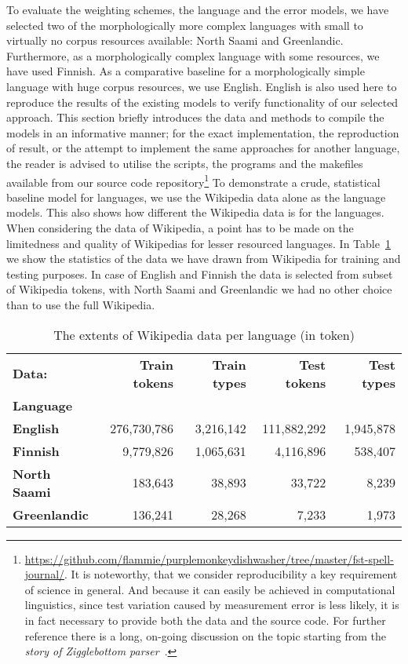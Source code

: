 \documentclass[a4paper,12pt]{article}
\begin{document}
To evaluate the weighting schemes, the language and the error models, we have
selected two of the morphologically more complex languages with small to
virtually no corpus resources available: North Saami and Greenlandic.
Furthermore, as a morphologically complex language with some resources, we have
used Finnish.  As a comparative baseline for a morphologically simple language
with huge corpus resources, we use English. English is also used here to
reproduce the results of the existing models to verify functionality of our
selected approach. This section briefly introduces the data and methods to
compile the models in an informative manner; for the exact implementation, the
reproduction of result, or the attempt to implement the same approaches for
another language, the reader is advised to utilise the scripts, the programs
and the makefiles available from our source code
repository\footnote{\url{https://github.com/flammie/purplemonkeydishwasher/tree/master/fst-spell-journal/}.
    It is noteworthy, that we consider reproducibility a key requirement of
    science in general. And because it can easily be achieved in computational
    linguistics, since test variation caused by measurement error is less
    likely, it is in fact necessary to provide both the data and the source
    code.  For further reference there is 
    a long, on-going  discussion on the topic starting from
the \emph{story of Zigglebottom
parser}~\cite[]{pedersen2008empiricism,fokkensoffspring}.} To demonstrate a
crude, statistical baseline model for languages, we use the Wikipedia data
alone as the language models. This also shows how different the Wikipedia data
is for the languages.  When considering the data of Wikipedia, a point has to
be made on the limitedness and quality of Wikipedias for lesser resourced
languages. In Table~\ref{table:wikipedia-data} we show the statistics of the
data we have drawn from Wikipedia for training and testing purposes. In case of
English and Finnish the data is selected from subset of Wikipedia tokens, with
North Saami and Greenlandic we had no other choice than to use the full
Wikipedia.

\begin{table}
    \centering
    \begin{tabular}{|l|r|r|r|r|}
        \hline
        \bf Data:       & \bf Train tokens & \bf Train types & \bf Test tokens & \bf Test types \\
        \bf Language    &             &           &             &  \\
        \hline
        \bf English     & 276,730,786 & 3,216,142 & 111,882,292 & 1,945,878 \\
        \hline
        \bf Finnish     & 9,779,826   & 1,065,631 & 4,116,896   & 538,407 \\
        \hline
        \bf North Saami & 183,643     & 38,893    & 33,722      & 8,239 \\
        \hline
        \bf Greenlandic & 136,241     & 28,268    & 7,233       & 1,973 \\
        \hline
    \end{tabular}
    \caption{The extents of Wikipedia data per language (in token)
    \label{table:wikipedia-data}}
\end{table}
\end{document}
